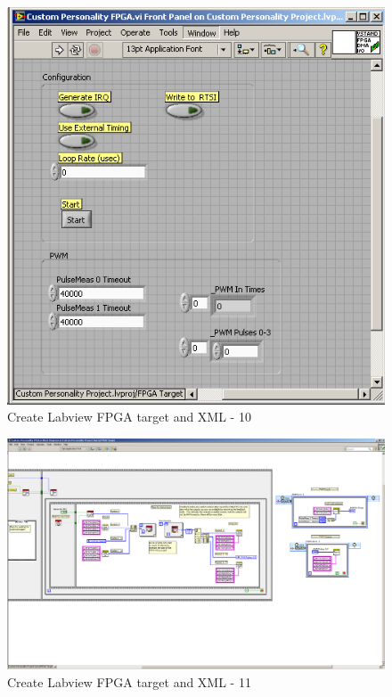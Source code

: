 \documentclass[a4paper,twoside,english]{report}
\begin{document}
\begin{figure}[!h]
\centering \includegraphics[scale=0.45]{Screenshots/Screenshot_2015-01-16_19-28-41.png}
\caption{Create Labview FPGA target and XML - 10}

\label{fig: Create Labview FPGA target and XML-10} 
\end{figure}

\begin{figure}[!h]
\centering \includegraphics[angle=-90,scale=0.45]{Screenshots/Screenshot_2015-01-16_19-29-04.png}
\caption{Create Labview FPGA target and XML - 11}

\label{fig: Create Labview FPGA target and XML-11} 
\end{figure}
\end{document}
